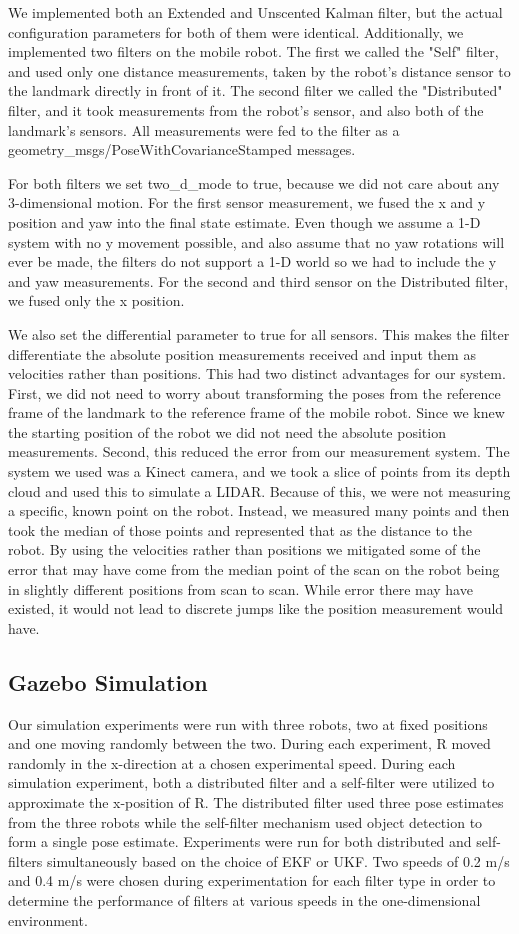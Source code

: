 \documentclass[conference]{IEEEtran}
\begin{document}
We implemented both an Extended and Unscented Kalman filter, but the actual configuration parameters for both of them 
were identical. Additionally, we implemented two filters on the mobile robot. The first we called the "Self" filter, 
and used only one distance measurements, taken by the robot's distance sensor to the landmark directly in front of it. 
The second filter we called the "Distributed" filter, and it took measurements from the robot's sensor, and also both 
of the landmark's sensors. All measurements were fed to the filter as a geometry\_msgs/PoseWithCovarianceStamped 
messages.

For both filters we set two\_d\_mode to true, because we did not care about any 3-dimensional motion. For the first 
sensor measurement, we fused the x and y position and yaw into the final state estimate. Even though we assume a 1-D 
system with no y movement possible, and also assume that no yaw rotations will ever be made, the filters do not support 
a 1-D world so we had to include the y and yaw measurements. For the second and third sensor on the Distributed filter, 
we fused only the x position.

We also set the differential parameter to true for all sensors. This makes the filter differentiate the absolute 
position measurements received and input them as velocities rather than positions. This had two distinct advantages for 
our system. First, we did not need to worry about transforming the poses from the reference frame of the landmark to 
the reference frame of the mobile robot. Since we knew the starting position of the robot we did not need the absolute 
position measurements. Second, this reduced the error from our measurement system. The system we used was a Kinect 
camera, and we took a slice of points from its depth cloud and used this to simulate a LIDAR. Because of this, we were 
not measuring a specific, known point on the robot. Instead, we measured many points and then took the median of those 
points and represented that as the distance to the robot. By using the velocities rather than positions we mitigated 
some of the error that may have come from the median point of the scan on the robot being in slightly different 
positions from scan to scan. While error there may have existed, it would not lead to discrete jumps like the position 
measurement would have.
\subsection{Gazebo Simulation}
Our simulation experiments were run with three robots, two at fixed positions and one moving randomly between the two. 
During each experiment, R moved randomly in the x-direction at a chosen experimental speed. During each simulation 
experiment, both a distributed filter and a self-filter were utilized to approximate the x-position of R. 
The distributed filter used three pose estimates from the three robots while the self-filter mechanism used object 
detection to form a single pose estimate. Experiments were run for both distributed and self-filters simultaneously 
based on the choice of EKF or UKF. Two speeds of 0.2 m/s and 0.4 m/s were chosen during experimentation for each filter 
type in order to determine the performance of filters at various speeds in the one-dimensional environment.
\end{document}
